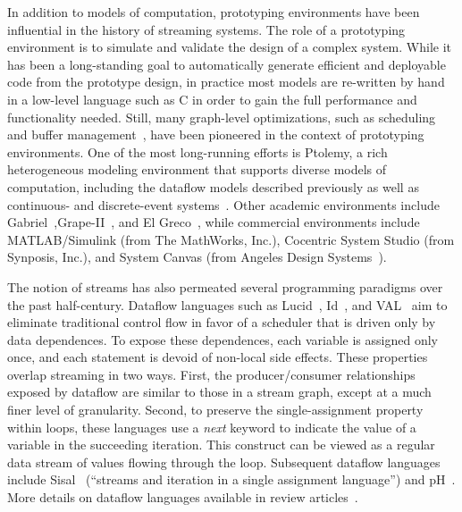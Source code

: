 In addition to models of computation, prototyping environments have
been influential in the history of streaming systems.  The role of a
prototyping environment is to simulate and validate the design of a
complex system.  While it has been a long-standing goal to
automatically generate efficient and deployable code from the
prototype design, in practice most models are re-written by hand in a
low-level language such as C in order to gain the full performance and
functionality needed.  Still, many graph-level optimizations, such as
scheduling~\cite{bhattacharyya_optimal_1995,bhattacharyya_software_1996,bhattacharyya_self-timed_1996,zitzler_multidimensional_2000,stuijk_exploring_2006}
and buffer management~\cite{ad_data_1997,murthy_shared_2001,govindarajan_minimizing_2002,murthy_buffer_2004,geilen_minimising_2005}, have
been pioneered in the context of prototyping environments.  One of the
most long-running efforts is Ptolemy, a rich heterogeneous modeling
environment that supports diverse models of computation, including the
dataflow models described previously as well as continuous- and
discrete-event systems~\cite{buck_multirate_1991,eker_taming_2003}.
Other academic environments include
Gabriel~\cite{lee_gabriel:design_1989},Grape-II~\cite{lauwereins_grape-ii:system-level_1995},
and El Greco~\cite{buck_heterogeneous_2000}, while commercial
environments include MATLAB/Simulink (from The MathWorks, Inc.),
Cocentric System Studio (from Synposis, Inc.), and System Canvas (from
Angeles Design Systems~\cite{murthy_system_2001}).


The notion of streams has also permeated several programming paradigms
over the past half-century.  Dataflow languages such as
Lucid~\cite{ashcroft_lucidnonprocedural_1977},
Id~\cite{arvind_asynchronous_1978,nikhil_id_1991}, and
VAL~\cite{ackerman_VAL--value-oriented_1979} aim to eliminate
traditional control flow in favor of a scheduler that is driven only
by data dependences.  To expose these dependences, each variable is
assigned only once, and each statement is devoid of non-local side
effects.  These properties overlap streaming in two ways.  First, the
producer/consumer relationships exposed by dataflow are similar to
those in a stream graph, except at a much finer level of granularity.
Second, to preserve the single-assignment property within loops, these
languages use a {\it next} keyword to indicate the value of a variable
in the succeeding iteration.  This construct can be viewed as a
regular data stream of values flowing through the loop.  Subsequent
dataflow languages include Sisal~\cite{mcgraw_sisal:_1985} (``streams
and iteration in a single assignment language'')
and pH~\cite{nikhil_implicit_2001}.
More details on dataflow languages available in review
articles~\cite{johnston_advances_2004,stephens_survey_1997}.

